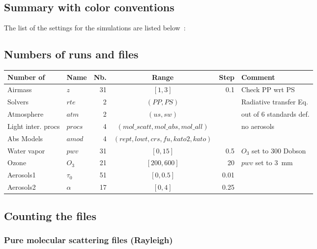 \documentclass[a4paper]{article}
\begin{document}
\subsection{Summary with color conventions}
The list of the settings for the simulations are listed below~:

\subsection{Numbers of runs and files}

\begin{table}[h]
{\small
\begin{tabular} {|l|l|r|c|r|l|}  \hline\hline
Number of & Name & Nb. & Range & Step & Comment \\ \hline\hline
Airmass    &   $z$                 &     31     & $[1,3]$ & 0.1   & Check PP wrt PS \\
Solvers     & $rte$             &       2      & $(PP,PS)$ &    &  Radiative transfer Eq. \\
Atmosphere &  $atm$       &     2        &  $(us,sw)$ &   &  out of 6 standards def.\\
Light inter. procs    &  $procs$    &   4          & $(mol\_scatt,mol\_abs,mol\_all)$ & & no aerosols \\
Abs Models  & $amod$  & 4 & $(rept,lowt,crs,fu,kato2,kato)$ & &  \\
Water vapor  & $pwv$    & 31 & $[0,15]$ & 0.5  & $O_3$ set to 300 Dobson \\
Ozone        & $O_3$      & 21  & $[200,600]$ & 20 & $pwv$ set to 3~mm \\ \hline
Aerosols1     &  $\tau_0$  & 51  & $[0,0.5]$   & 0.01 &  \\
Aerosols2     & $\alpha$  &  17 & $[0,4]$ & 0.25 &  \\ \hline 
\hline
\end{tabular}
}
\end{table}



\subsection{Counting the files}

\subsubsection{Pure molecular scattering files (Rayleigh)}
\end{document}
